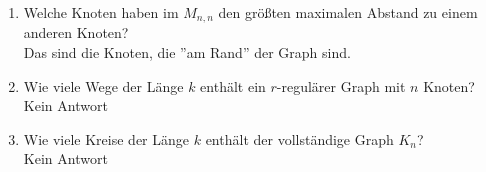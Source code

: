\begin{enumerate}[label=(\alph*)]
        \item Welche Knoten haben im $M_{n,n}$ den größten maximalen Abstand zu einem anderen Knoten? \\
        Das sind die Knoten, die ''am Rand'' der Graph sind.
        
        \item Wie viele Wege der Länge $k$ enthält ein $r$-regulärer Graph mit $n$ Knoten? \\
        Kein Antwort
        
        \item Wie viele Kreise der Länge $k$ enthält der vollständige Graph $K_n$? \\
        Kein Antwort
        
        
    \end{enumerate}
